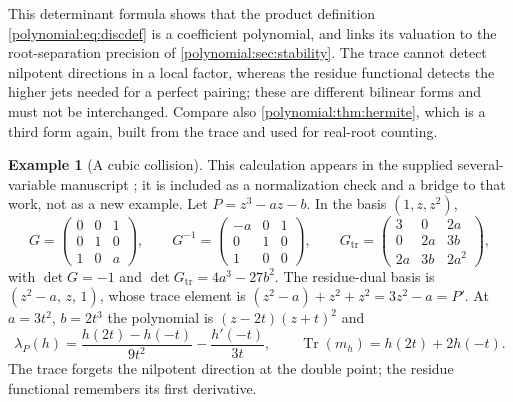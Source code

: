 \documentclass[11pt,letterpaper]{article}
\numberwithin{equation}{section}
\theoremstyle{definition}
\newtheorem{example}[theorem]{Example}
\theoremstyle{remark}\newtheorem{remark}[theorem]{Remark}
\newcommand{\Tr}{\operatorname{Tr}}
\begin{document}
This determinant formula shows that the product definition
\eqref{polynomial:eq:discdef} is a coefficient polynomial, and links its
valuation to the root-separation precision of
\cref{polynomial:sec:stability}. The trace cannot detect nilpotent directions
in a local factor, whereas the residue functional detects the higher jets
needed for a perfect pairing; these are different bilinear forms and must not
be interchanged. Compare also \cref{polynomial:thm:hermite}, which is a third
form again, built from the trace and used for real-root counting.

\begin{example}[A cubic collision]\label{polynomial:ex:cubicduality}
This calculation appears in the supplied several-variable manuscript
\cite{polynomial:SourceResearch}; it is included as a normalization check and
a bridge to that work, not as a new example. Let $P=z^3-az-b$. In the basis
$(1,z,z^2)$,
\[
 G=\begin{pmatrix}0&0&1\\0&1&0\\1&0&a\end{pmatrix},\qquad
 G^{-1}=\begin{pmatrix}-a&0&1\\0&1&0\\1&0&0\end{pmatrix},\qquad
 G_{\mathrm{tr}}=\begin{pmatrix}3&0&2a\\0&2a&3b\\2a&3b&2a^2\end{pmatrix},
\]
with $\det G=-1$ and $\det G_{\mathrm{tr}}=4a^3-27b^2$. The residue-dual basis
is $(z^2-a,\,z,\,1)$, whose trace element is $(z^2-a)+z^2+z^2=3z^2-a=P'$. At
$a=3t^2$, $b=2t^3$ the polynomial is $(z-2t)(z+t)^2$ and
\begin{equation}\label{polynomial:eq:cubiccollision}
 \lambda_P(h)=\frac{h(2t)-h(-t)}{9t^2}-\frac{h'(-t)}{3t},
 \qquad \Tr(m_h)=h(2t)+2h(-t).
\end{equation}
The trace forgets the nilpotent direction at the double point; the residue
functional remembers its first derivative.
\end{example}
\end{document}
